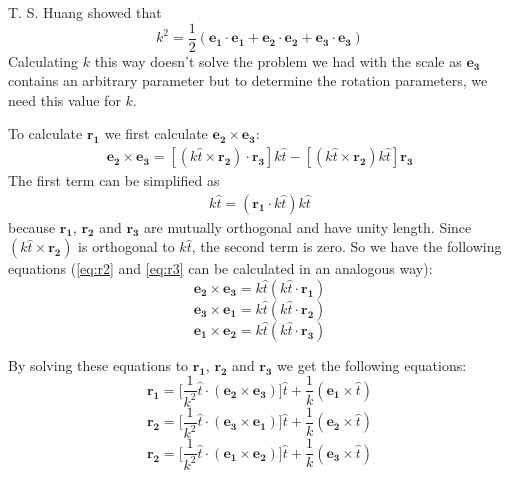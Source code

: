 T. S. Huang \cite{improc} showed that 
\begin{equation}
    k^2 = \frac{1}{2}(\boldsymbol{e_1}\cdot\boldsymbol{e_1} + \boldsymbol{e_2}\cdot\boldsymbol{e_2} + \boldsymbol{e_3}\cdot\boldsymbol{e_3})
\end{equation}
Calculating $k$ this way doesn't solve the problem we had with the scale as $\boldsymbol{e_3}$ contains an arbitrary parameter but to determine the rotation parameters, we need this value for $k$.\bigskip

To calculate $\boldsymbol{r_1}$ we first calculate $\boldsymbol{e_2 \times e_3}$:
\begin{align*}
    \boldsymbol{e_2} \times \boldsymbol{e_3} = [(k\hat{t}\times \boldsymbol{r_2})\cdot\boldsymbol{r_3}]k\hat{t} - [(k \hat{t} \times \boldsymbol{r_2})k \hat{t}]\boldsymbol{r_3}
\end{align*}
The first term can be simplified as 
\begin{align}
    [(\boldsymbol{r_2}\times\boldsymbol{r_3})\cdot k\hat{t}]k\hat{t} = (\boldsymbol{r_1}\cdot k\hat{t})k\hat{t}
\end{align}
because $\boldsymbol{r_1}$, $\boldsymbol{r_2}$ and $\boldsymbol{r_3}$ are mutually orthogonal and have unity length. Since $(k\hat{t}\times\boldsymbol{r_2})$ is orthogonal to $k\hat{t}$, the second term is zero. So we have the following equations (\autoref{eq:r2} and \autoref{eq:r3} can be calculated in an analogous way):
\begin{equation}
    \boldsymbol{e_2} \times \boldsymbol{e_3} = k\hat{t}(k\hat{t}\cdot\boldsymbol{r_1})
\end{equation}
\begin{equation}\label{eq:r2}
    \boldsymbol{e_3} \times \boldsymbol{e_1} = k\hat{t}(k\hat{t}\cdot\boldsymbol{r_2})
\end{equation}
\begin{equation}\label{eq:r3}
    \boldsymbol{e_1} \times \boldsymbol{e_2} = k\hat{t}(k\hat{t}\cdot\boldsymbol{r_3})
\end{equation}

By solving these equations to $\boldsymbol{r_1}$, $\boldsymbol{r_2}$ and $\boldsymbol{r_3}$ we get the following equations:
\begin{equation}
    \boldsymbol{r_1} = \biggl[\frac{1}{k^2}\hat{t}\cdot(\boldsymbol{e_2}\times\boldsymbol{e_3})\biggr]\hat{t}+\frac{1}{k}(\boldsymbol{e_1}\times\hat{t})
\end{equation}
\begin{equation}
    \boldsymbol{r_2} = \biggl[\frac{1}{k^2}\hat{t}\cdot(\boldsymbol{e_3}\times\boldsymbol{e_1})\biggr]\hat{t}+\frac{1}{k}(\boldsymbol{e_2}\times\hat{t})
\end{equation}
\begin{equation}
    \boldsymbol{r_2} = \biggl[\frac{1}{k^2}\hat{t}\cdot(\boldsymbol{e_1}\times\boldsymbol{e_2})\biggr]\hat{t}+\frac{1}{k}(\boldsymbol{e_3}\times\hat{t})
\end{equation}\bigskip


